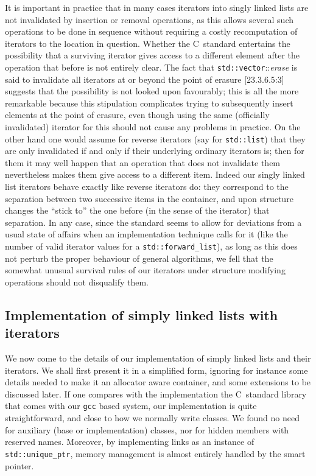 \documentclass[12pt]{article}
\theoremstyle{plain}
\theoremstyle{definition}
\def\PP{\copy\PPbox}
\newcommand\Cee{\textsc{C}}
\newcommand\Cpp{\Cee\PP}
\newcommand\std[1]{\texttt{std::#1}}
\def\frwl.{\std{forward\_list}}
\def\vect.{\std{vector}}
\def\uptr.{\std{unique\_ptr}}
\begin{document}
It is important in practice that in many cases iterators into singly linked
lists are not invalidated by insertion or removal operations, as this allows
several such operations to be done in sequence without requiring a costly
recomputation of iterators to the location in question. Whether the
\Cpp\ standard entertains the possibility that a surviving iterator gives access
to a different element after the operation that before is not entirely clear.
The fact that \vect.::\textit{erase} is said to invalidate all iterators
at or beyond the point of erasure [23.3.6.5:3] suggests that the possibility is
not looked upon favourably; this is all the more remarkable because this
stipulation complicates trying to subsequently insert elements at the point of
erasure, even though using the same (officially invalidated) iterator for this
should not cause any problems in practice. On the other hand one would assume
for reverse iterators (say for \std{list}) that they are only invalidated if and
only if their underlying ordinary iterators is; then for them it may well happen
that an operation that does not invalidate them nevertheless makes them give
access to a different item. Indeed our singly linked list iterators behave
exactly like reverse iterators do: they correspond to the separation between two
successive items in the container, and upon structure changes the ``stick to''
the one before (in the sense of the iterator) that separation. In any case,
since the standard seems to allow for deviations from a usual state of affairs
when an implementation technique calls for it (like the number of valid iterator
values for a \frwl.), as long as this does not perturb the proper behaviour of
general algorithms, we fell that the somewhat unusual survival rules of our
iterators under structure modifying operations should not disqualify them.


\subsection{Implementation of simply linked lists with iterators}

We now come to the details of our implementation of simply linked lists and
their iterators. We shall first present it in a simplified form, ignoring for
instance some details needed to make it an allocator aware container, and some
extensions to be discussed later. If one compares with the implementation the
\Cpp\ standard library that comes with our \texttt{gcc} based system, our
implementation is quite straightforward, and close to how we normally write
classes. We found no need for auxiliary (base or implementation) classes, nor
for hidden members with reserved names. Moreover, by implementing links as an
instance of \uptr., memory management is almost entirely handled by the smart
pointer.
\end{document}
